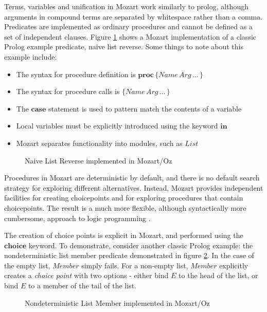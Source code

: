 Terms, variables and unification in Mozart work similarly to prolog,
although arguments in compound terms are separated by whitespace rather
than a comma. Predicates are implemented as ordinary procedures and
cannot be defined as a set of independent clauses. Figure \ref{fig:Background:Naive-List-Reverse}
shows a Mozart implementation of a classic Prolog example predicate,
naive list reverse. Some things to note about this example include:

\begin{itemize}
\item The syntax for procedure definition is $\mathbf{proc}\,\{Name\, Arg\,\dots\,\}$ 
\item The syntax for procedure calls is $\{Name\, Arg\,\dots\,\}$ 
\item The $\mathbf{case}$ statement is used to pattern match the contents
of a variable 
\item Local variables must be explicitly introduced using the keyword $\mathbf{in}$ 
\item Mozart separates functionality into modules, such as $List$ 
\end{itemize}
%
\begin{figure}[t]

\caption{Naive List Reverse implemented in Mozart/Oz\label{fig:Background:Naive-List-Reverse}}

\end{figure}


Procedures in Mozart are deterministic by default, and there is no
default search strategy for exploring different alternatives. Instead,
Mozart provides independent facilities for creating choicepoints and
for exploring procedures that contain choicepoints. The result is
a much more flexible, although syntactically more cumbersome, approach
to logic programming \citep{lpinoz99}.

The creation of choice points is explicit in Mozart, and performed
using the $\mathbf{choice}$ keyword. To demonstrate, consider another
classic Prolog example: the nondeterministic list member predicate
demonstrated in figure \ref{fig:Background:Nondet-Member}. In the
case of the empty list, $Member$ simply fails. For a non-empty list,
$Member$ explicitly creates a \emph{choice point} with two options
- either bind $E$ to the head of the list, or bind $E$ to a member
of the tail of the list.

%
\begin{figure}[t]

\caption{Nondeterministic List Member implemented in Mozart/Oz\label{fig:Background:Nondet-Member}}

\end{figure}


